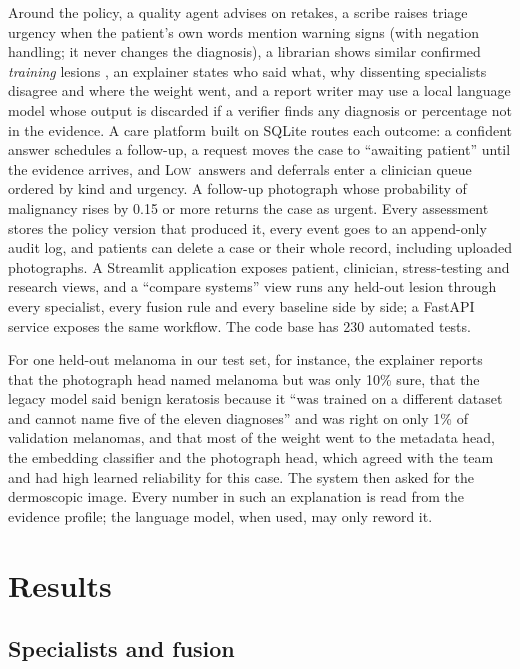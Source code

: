 \documentclass[conference]{IEEEtran}
\newcommand{\LOW}{\textsc{Low}}
\begin{document}
Around the policy, a quality agent advises on retakes, a scribe raises triage urgency when
the patient's own words mention warning signs (with negation handling; it never changes
the diagnosis), a librarian shows similar confirmed \emph{training} lesions
, an explainer states who said what, why dissenting specialists
disagree and where the weight went, and a report writer may use a local language model
whose output is discarded if a verifier finds any diagnosis or percentage not in the
evidence. A care platform built on SQLite routes each outcome: a confident answer schedules a
follow-up, a request moves the case to ``awaiting patient'' until the evidence arrives,
and \LOW\ answers and deferrals enter a clinician queue ordered by kind and urgency. A
follow-up photograph whose probability of malignancy rises by 0.15 or more returns the
case as urgent. Every assessment stores the policy version that produced it, every event
goes to an append-only audit log, and patients can delete a case or their whole record,
including uploaded photographs. A Streamlit application exposes patient, clinician,
stress-testing and research views, and a ``compare systems'' view runs any held-out lesion
through every specialist, every fusion rule and every baseline side by side; a FastAPI
service exposes the same workflow. The code base has 230 automated tests.

For one held-out melanoma in our test set, for instance, the explainer reports that the
photograph head named melanoma but was only 10\% sure, that the legacy model said benign
keratosis because it ``was trained on a different dataset and cannot name five of the
eleven diagnoses'' and was right on only 1\% of validation melanomas, and that most of
the weight went to the metadata head, the embedding classifier and the photograph head,
which agreed with the team and had high learned reliability for this case. The system then
asked for the dermoscopic image. Every number in such an explanation is read from the
evidence profile; the language model, when used, may only reword it.

\section{Results}\label{sec:results}

\subsection{Specialists and fusion}
\end{document}
